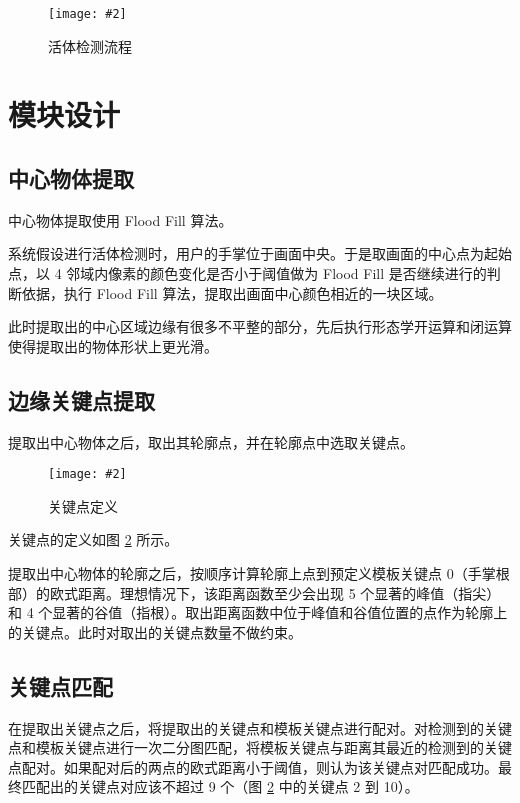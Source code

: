 \documentclass[a4paper, fontset=none]{article}
\newcommand{\img}[2]{\begin{center}\texttt{[image: \#2]}\end{center}}
\begin{document}
\begin{figure}
    \img{0.4}{flowchart.png}
    \caption{活体检测流程}
    \label{flowchart}
\end{figure}


\section{模块设计}

\subsection{中心物体提取}

中心物体提取使用 Flood Fill 算法。

系统假设进行活体检测时，用户的手掌位于画面中央。于是取画面的中心点为起始点，以 4 邻域内像素的颜色变化是否小于阈值做为 Flood Fill 是否继续进行的判断依据，执行 Flood Fill 算法，提取出画面中心颜色相近的一块区域。

此时提取出的中心区域边缘有很多不平整的部分，先后执行形态学开运算和闭运算使得提取出的物体形状上更光滑。

\subsection{边缘关键点提取}

提取出中心物体之后，取出其轮廓点，并在轮廓点中选取关键点。

\begin{figure}[H]
    \img{0.6}{./hand.jpg}
    \caption{关键点定义}
    \label{hand}
\end{figure}

关键点的定义如图 \ref{hand} 所示。

提取出中心物体的轮廓之后，按顺序计算轮廓上点到预定义模板关键点 0（手掌根部）的欧式距离。理想情况下，该距离函数至少会出现 5 个显著的峰值（指尖）和 4 个显著的谷值（指根）。取出距离函数中位于峰值和谷值位置的点作为轮廓上的关键点。此时对取出的关键点数量不做约束。

\subsection{关键点匹配}

在提取出关键点之后，将提取出的关键点和模板关键点进行配对。对检测到的关键点和模板关键点进行一次二分图匹配，将模板关键点与距离其最近的检测到的关键点配对。如果配对后的两点的欧式距离小于阈值，则认为该关键点对匹配成功。最终匹配出的关键点对应该不超过 9 个（图 \ref{hand} 中的关键点 2 到 10）。
\end{document}
